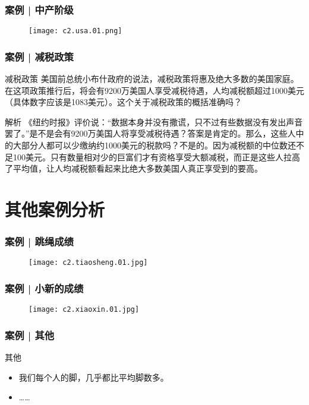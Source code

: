 \begin{frame}
  \frametitle{案例 | 中产阶级}
  \begin{figure}
    \centering
    \texttt{[image: c2.usa.01.png]}
  \end{figure}
\end{frame}

\begin{frame}
  \frametitle{案例 | 减税政策}
  \begin{block}{减税政策}
    美国前总统小布什政府的说法，减税政策将惠及绝大多数的美国家庭。在这项政策推行后，将会有9200万美国人享受减税待遇，人均减税额超过1000美元（具体数字应该是1083美元）。这个关于减税政策的概括准确吗？
  \end{block}
  \pause \pause \pause \pause
  \begin{block}{解析}
    《纽约时报》评价说：“数据本身并没有撒谎，只不过有些数据没有发出声音罢了。”是不是会有9200万美国人将享受减税待遇？答案是肯定的。那么，这些人中的大部分人都可以少缴纳约1000美元的税款吗？不是的。因为减税额的中位数还不足100美元。只有数量相对少的巨富们才有资格享受大额减税，而正是这些人拉高了平均值，让人均减税额看起来比绝大多数美国人真正享受到的要高。
  \end{block}
\end{frame}

\section{其他案例分析}
\begin{frame}
  \frametitle{案例 | 跳绳成绩}
  \begin{figure}
    \centering
    \texttt{[image: c2.tiaosheng.01.jpg]}
  \end{figure}
\end{frame}

\begin{frame}
  \frametitle{案例 | 小新的成绩}
  \begin{figure}
    \centering
    \texttt{[image: c2.xiaoxin.01.jpg]}
  \end{figure}
\end{frame}

\begin{frame}
  \frametitle{案例 | 其他}
  \begin{block}{其他}
    \begin{itemize}
      \item 我们每个人的脚，几乎都比平均脚数多。
      \item ……
    \end{itemize}
  \end{block}
\end{frame}

